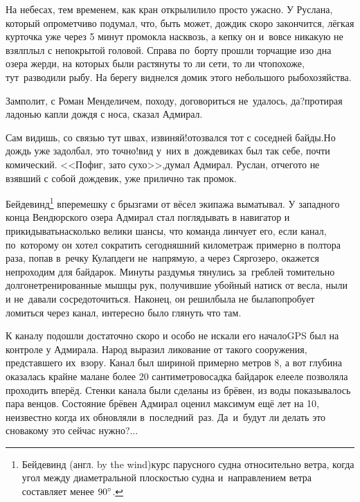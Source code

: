 На небесах, тем временем, как кран открыли\mdash лило просто ужасно. У Руслана, который опрометчиво подумал, что, быть может, дождик скоро закончится, лёгкая курточка уже через 5 минут промокла насквозь, а кепку он и~вовсе никакую не взял\mdash плыл с непокрытой головой. Справа по~борту прошли торчащие изо дна озера жерди, на которых были растянуты то ли сети, то ли что\mdash похоже, тут~разводили рыбу. На берегу виднелся домик этого небольшого рыбохозяйства.

\diagdash Замполит, с Роман Менделичем, походу, договориться не~удалось, да?\mdash протирая ладонью капли дождя с носа, сказал Адмирал.

\diagdash Сам видишь, со связью тут швах, извиняй!\mdash отозвался тот с соседней байды.\mdash Но дождь уже задолбал, это точно!\mdash вид у~них в~дождевиках был так себе, почти комический. <<Пофиг, зато сухо>>,\mdash думал Адмирал. Руслан, отчего\sdash то не взявший с собой дождевик, уже прилично так промок.

\renewcommand*{\thefootnote}{\fnsymbol{footnote}}
\setcounter{footnote}{0}
Бейдевинд\footnote{Бейдевинд (англ. by the wind)\mdash курс парусного судна относительно ветра, когда угол между диаметральной плоскостью судна и~направлением ветра составляет менее $90\degree$\cite{МорскойСправочник}.} вперемешку с брызгами от вёсел экипажа выматывал. У западного конца Вендюрского озера Адмирал стал поглядывать в навигатор и прикидывать\mdash насколько велики шансы, что команда линчует его, если канал, по~которому он хотел сократить сегодняшний километраж примерно в полтора раза, попав в~речку Кулапдеги не~напрямую, а через Сяргозеро, окажется непроходим для байдарок. Минуты раздумья тянулись за~греблей томительно долго\mdash нетренированные мышцы рук, получившие убойный натиск от весла, ныли и не~давали сосредоточиться. Наконец, он решил\mdash была не была\mdash попробует ломиться через канал, интересно было глянуть что там.

К каналу подошли достаточно скоро и особо не искали его начало\mdash GPS был на контроле у Адмирала. Народ выразил ликование от такого сооружения, представшего их~взору. Канал был шириной примерно метров 8, а вот глубина оказалась крайне мала\mdash не более 20 сантиметров\mdash осадка байдарок еле\sdash еле позволяла проходить вперёд. Стенки канала были сделаны из брёвен, из воды показывалось пара венцов. Состояние брёвен Адмирал оценил максимум ещё лет на 10, неизвестно когда их обновляли в~последний~раз. Да~и~будут ли делать это снова\mdash кому это сейчас нужно?$\ldots$

